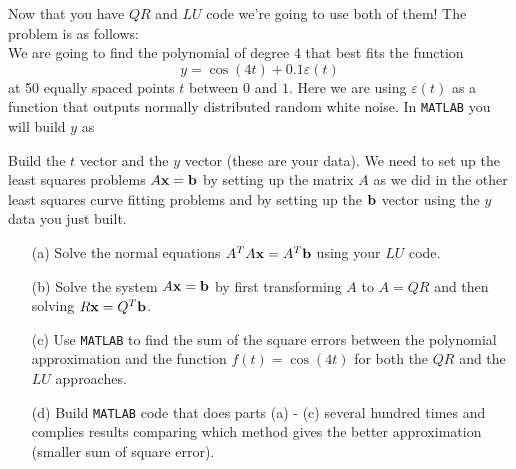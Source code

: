 \begin{problem}
    Now that you have $QR$ and $LU$ code we're going to use both of them!  The problem is
    as follows: \\
    We are going to find the polynomial of degree 4 that best fits the function 
    \[ y =
    \cos(4t) + 0.1 \varepsilon(t) \]
    at 50 equally spaced points $t$ between $0$ and $1$.  Here
    we are using $\varepsilon(t)$ as a function that outputs normally distributed random
    white noise.  In \texttt{MATLAB} you will build $y$ as \\
    
    Build the $t$ vector
    and the $y$ vector (these are your data).  We need to set up the least squares
    problems $A {\bf x} = {\bf b}$ by setting up the matrix $A$
    as we did in the other least squares curve fitting problems and by setting up the
    ${\bf b}$ vector using the $y$ data you just built.  
    \begin{enumerate}
        \item[(a)] Solve the normal equations $A^T A {\bf x} = A^T {\bf b}$ using your $LU$ code.
        \item[(b)] Solve the system $A {\bf x} = {\bf b}$ by first transforming $A$ to $A = QR$
            and then solving $R{\bf x} = Q^T {\bf b}$.
        \item[(c)] Use \texttt{MATLAB} to find the sum of the square errors between the
            polynomial approximation and the function $f(t) = \cos(4t)$ for both the $QR$
            and the $LU$ approaches.  
        \item[(d)] Build \texttt{MATLAB} code that does parts (a) - (c) several hundred
            times and complies results comparing which method gives the better
            approximation (smaller sum of square error).
    \end{enumerate}
\end{problem}


